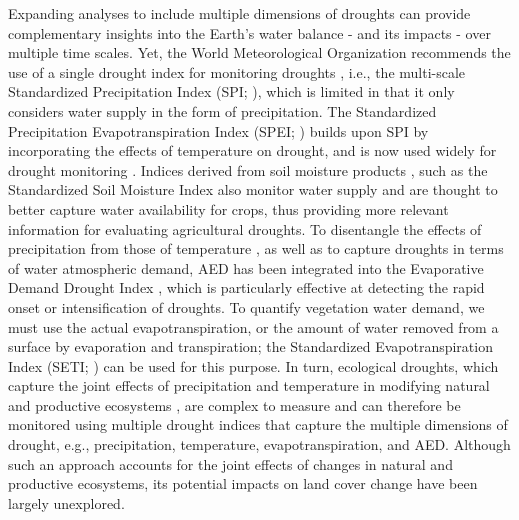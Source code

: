 \documentclass[
  sn-nature,
  numbered]{sn-jnl}
\begin{document}
Expanding analyses to include multiple dimensions of droughts can
provide complementary insights into the Earth's water balance - and its
impacts - over multiple time scales. Yet, the World Meteorological
Organization recommends the use of a single drought index for monitoring
droughts \citep{WMO2012}, i.e., the multi-scale Standardized
Precipitation Index (SPI; \citep{McKee1993}), which is limited in that
it only considers water supply in the form of precipitation. The
Standardized Precipitation Evapotranspiration Index (SPEI;
\citep{Vicente-Serrano2020}) builds upon SPI by incorporating the
effects of temperature on drought, and is now used widely for drought
monitoring \citep[e.g.,][]{Gebrechorkos2023, Liu2024}. Indices derived
from soil moisture products \citep{Narasimhan2005, Souza2021}, such as
the Standardized Soil Moisture Index
\citep[SSI,][]{AghaKouchak2014, AghaKouchak2015} also monitor water
supply and are thought to better capture water availability for crops,
thus providing more relevant information for evaluating agricultural
droughts. To disentangle the effects of precipitation from those of
temperature \citep{Vicente-Serrano2020}, as well as to capture droughts
in terms of water atmospheric demand, AED has been integrated into the
Evaporative Demand Drought Index \citep[EDDI,][]{McEvoy2016}, which is
particularly effective at detecting the rapid onset or intensification
of droughts. To quantify vegetation water demand, we must use the actual
evapotranspiration, or the amount of water removed from a surface by
evaporation and transpiration; the Standardized Evapotranspiration Index
(SETI; \citep{Yang2019}) can be used for this purpose. In turn,
ecological droughts, which capture the joint effects of precipitation
and temperature in modifying natural and productive ecosystems
\citep{Camps-Valls2021, Paruelo2016, Helman2014}, are complex to measure
and can therefore be monitored using multiple drought indices that
capture the multiple dimensions of drought, e.g., precipitation,
temperature, evapotranspiration, and AED. Although such an approach
accounts for the joint effects of changes in natural and productive
ecosystems, its potential impacts on land cover change have been largely
unexplored.
\end{document}

